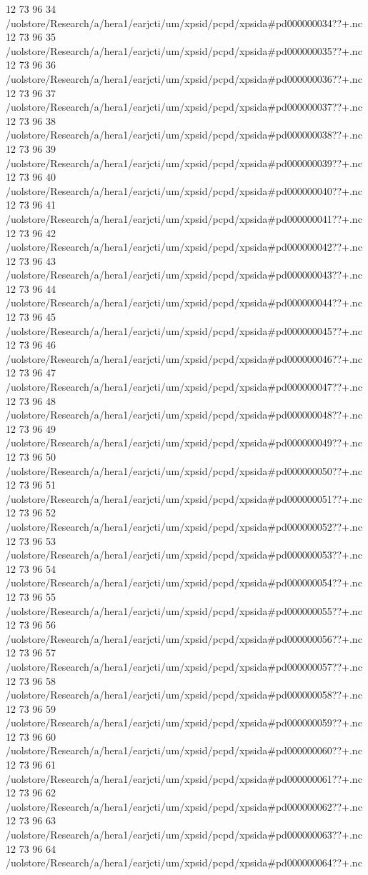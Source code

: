 12 73 96
34
/uolstore/Research/a/hera1/earjcti/um/xpsid/pcpd/xpsida#pd000000034??+.nc
12 73 96
35
/uolstore/Research/a/hera1/earjcti/um/xpsid/pcpd/xpsida#pd000000035??+.nc
12 73 96
36
/uolstore/Research/a/hera1/earjcti/um/xpsid/pcpd/xpsida#pd000000036??+.nc
12 73 96
37
/uolstore/Research/a/hera1/earjcti/um/xpsid/pcpd/xpsida#pd000000037??+.nc
12 73 96
38
/uolstore/Research/a/hera1/earjcti/um/xpsid/pcpd/xpsida#pd000000038??+.nc
12 73 96
39
/uolstore/Research/a/hera1/earjcti/um/xpsid/pcpd/xpsida#pd000000039??+.nc
12 73 96
40
/uolstore/Research/a/hera1/earjcti/um/xpsid/pcpd/xpsida#pd000000040??+.nc
12 73 96
41
/uolstore/Research/a/hera1/earjcti/um/xpsid/pcpd/xpsida#pd000000041??+.nc
12 73 96
42
/uolstore/Research/a/hera1/earjcti/um/xpsid/pcpd/xpsida#pd000000042??+.nc
12 73 96
43
/uolstore/Research/a/hera1/earjcti/um/xpsid/pcpd/xpsida#pd000000043??+.nc
12 73 96
44
/uolstore/Research/a/hera1/earjcti/um/xpsid/pcpd/xpsida#pd000000044??+.nc
12 73 96
45
/uolstore/Research/a/hera1/earjcti/um/xpsid/pcpd/xpsida#pd000000045??+.nc
12 73 96
46
/uolstore/Research/a/hera1/earjcti/um/xpsid/pcpd/xpsida#pd000000046??+.nc
12 73 96
47
/uolstore/Research/a/hera1/earjcti/um/xpsid/pcpd/xpsida#pd000000047??+.nc
12 73 96
48
/uolstore/Research/a/hera1/earjcti/um/xpsid/pcpd/xpsida#pd000000048??+.nc
12 73 96
49
/uolstore/Research/a/hera1/earjcti/um/xpsid/pcpd/xpsida#pd000000049??+.nc
12 73 96
50
/uolstore/Research/a/hera1/earjcti/um/xpsid/pcpd/xpsida#pd000000050??+.nc
12 73 96
51
/uolstore/Research/a/hera1/earjcti/um/xpsid/pcpd/xpsida#pd000000051??+.nc
12 73 96
52
/uolstore/Research/a/hera1/earjcti/um/xpsid/pcpd/xpsida#pd000000052??+.nc
12 73 96
53
/uolstore/Research/a/hera1/earjcti/um/xpsid/pcpd/xpsida#pd000000053??+.nc
12 73 96
54
/uolstore/Research/a/hera1/earjcti/um/xpsid/pcpd/xpsida#pd000000054??+.nc
12 73 96
55
/uolstore/Research/a/hera1/earjcti/um/xpsid/pcpd/xpsida#pd000000055??+.nc
12 73 96
56
/uolstore/Research/a/hera1/earjcti/um/xpsid/pcpd/xpsida#pd000000056??+.nc
12 73 96
57
/uolstore/Research/a/hera1/earjcti/um/xpsid/pcpd/xpsida#pd000000057??+.nc
12 73 96
58
/uolstore/Research/a/hera1/earjcti/um/xpsid/pcpd/xpsida#pd000000058??+.nc
12 73 96
59
/uolstore/Research/a/hera1/earjcti/um/xpsid/pcpd/xpsida#pd000000059??+.nc
12 73 96
60
/uolstore/Research/a/hera1/earjcti/um/xpsid/pcpd/xpsida#pd000000060??+.nc
12 73 96
61
/uolstore/Research/a/hera1/earjcti/um/xpsid/pcpd/xpsida#pd000000061??+.nc
12 73 96
62
/uolstore/Research/a/hera1/earjcti/um/xpsid/pcpd/xpsida#pd000000062??+.nc
12 73 96
63
/uolstore/Research/a/hera1/earjcti/um/xpsid/pcpd/xpsida#pd000000063??+.nc
12 73 96
64
/uolstore/Research/a/hera1/earjcti/um/xpsid/pcpd/xpsida#pd000000064??+.nc

